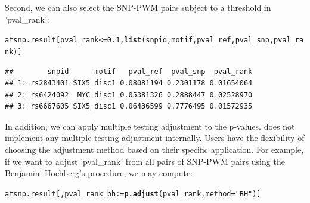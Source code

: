 \documentclass[a4paper,10pt]{article}\usepackage[]{graphicx}\usepackage[]{color}
\makeatletter
\newcommand{\hlnum}[1]{\textcolor[rgb]{0.686,0.059,0.569}{#1}}%
\newcommand{\hlstr}[1]{\textcolor[rgb]{0.192,0.494,0.8}{#1}}%
\newcommand{\hlopt}[1]{\textcolor[rgb]{0,0,0}{#1}}%
\newcommand{\hlstd}[1]{\textcolor[rgb]{0.345,0.345,0.345}{#1}}%
\newcommand{\hlkwb}[1]{\textcolor[rgb]{0.69,0.353,0.396}{#1}}%
\newcommand{\hlkwc}[1]{\textcolor[rgb]{0.333,0.667,0.333}{#1}}%
\newcommand{\hlkwd}[1]{\textcolor[rgb]{0.737,0.353,0.396}{\textbf{#1}}}%
\newenvironment{kframe}{%
 \def\at@end@of@kframe{}%
 \ifinner\ifhmode%
  \def\at@end@of@kframe{\end{minipage}}%
  \begin{minipage}{\columnwidth}%
 \fi\fi%
 \def\FrameCommand##1{\hskip\@totalleftmargin \hskip-\fboxsep
 \colorbox{shadecolor}{##1}\hskip-\fboxsep
     \hskip-\linewidth \hskip-\@totalleftmargin \hskip\columnwidth}%
 \MakeFramed {\advance\hsize-\width
   \@totalleftmargin\z@ \linewidth\hsize
   \@setminipage}}%
 {\par\unskip\endMakeFramed%
 \at@end@of@kframe}
\newenvironment{knitrout}{}{} %
\makeatother
\begin{document}
Second, we can also select the SNP-PWM pairs subject to a threshold in 'pval\_rank':

\begin{knitrout}
\color{fgcolor}\begin{kframe}
\begin{alltt}
\hlstd{atsnp.result[pval_rank} \hlopt{<=} \hlnum{0.1}\hlstd{,} \hlkwd{list}\hlstd{(snpid, motif, pval_ref, pval_snp, pval_rank)]}
\end{alltt}
\begin{verbatim}
##        snpid      motif   pval_ref  pval_snp  pval_rank
## 1: rs2843401 SIX5_disc1 0.08081194 0.2301178 0.01654064
## 2: rs6424092  MYC_disc1 0.05381326 0.2888447 0.02528970
## 3: rs6667605 SIX5_disc1 0.06436599 0.7776495 0.01572935
\end{verbatim}
\end{kframe}
\end{knitrout}

In addition, we can apply multiple testing adjustment to the p-values.  does not implement any multiple testing adjustment internally. Users have the flexibility of choosing the adjustment method based on their specific application. For example, if we want to adjust 'pval\_rank' from all pairs of SNP-PWM pairs using the Benjamini-Hochberg's procedure, we may compute:

\begin{knitrout}
\color{fgcolor}\begin{kframe}
\begin{alltt}
\hlstd{atsnp.result[, pval_rank_bh} \hlkwb{:=} \hlkwd{p.adjust}\hlstd{(pval_rank,} \hlkwc{method} \hlstd{=} \hlstr{"BH"}\hlstd{)]}
\end{alltt}
\end{kframe}
\end{knitrout}
\end{document}

